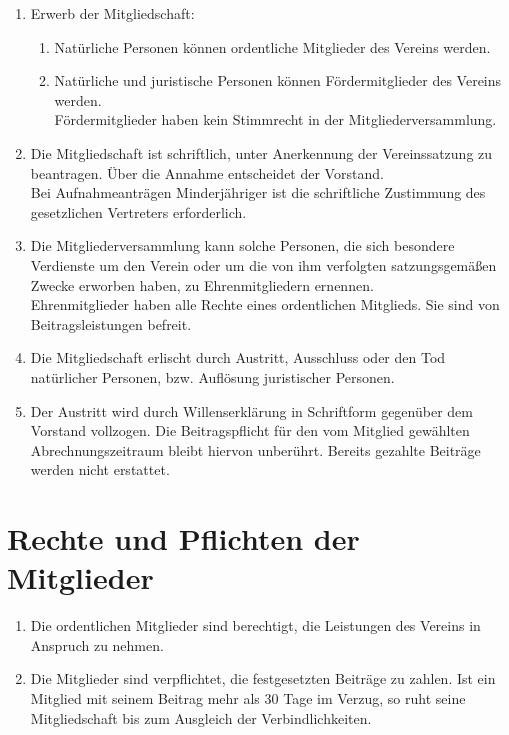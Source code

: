 \documentclass[10pt,a4paper]{scrartcl}
\begin{document}
\begin{enumerate}[label=(\arabic*)]
\item
  Erwerb der Mitgliedschaft:
  \begin{enumerate}[label=(\alph*)]
  \item
    Natürliche Personen können ordentliche Mitglieder des Vereins werden.
  \item
    Natürliche und juristische Personen können Fördermitglieder des Vereins werden.\\
    Fördermitglieder haben kein Stimmrecht in der Mitgliederversammlung.
  \end{enumerate}
\item
  Die Mitgliedschaft ist schriftlich, unter Anerkennung der Vereinssatzung zu beantragen.
  Über die Annahme entscheidet der Vorstand.\\
  Bei Aufnahmeanträgen Minderjähriger ist die schriftliche Zustimmung des gesetzlichen
  Vertreters erforderlich.
\item
  Die Mitgliederversammlung kann solche Personen, die sich besondere Verdienste um
  den Verein oder um die von ihm verfolgten satzungsgemäßen Zwecke erworben
  haben, zu Ehrenmitgliedern ernennen.\\
  Ehrenmitglieder haben alle Rechte eines ordentlichen Mitglieds.
  Sie sind von Beitragsleistungen befreit.
\item
  Die Mitgliedschaft erlischt durch Austritt, Ausschluss oder den Tod natürlicher
  Personen, bzw. Auflösung juristischer Personen.
\item
  Der Austritt wird durch Willenserklärung in Schriftform gegenüber dem Vorstand
  vollzogen. Die Beitragspflicht für den vom Mitglied gewählten Abrechnungszeitraum
  bleibt hiervon unberührt. Bereits gezahlte Beiträge werden nicht erstattet.
\end{enumerate}


\section{Rechte und Pflichten der Mitglieder}

\begin{enumerate}[label=(\arabic*)]
\item
  Die ordentlichen Mitglieder sind berechtigt, die Leistungen des Vereins
  in Anspruch zu nehmen.
\item
  Die Mitglieder sind verpflichtet, die festgesetzten Beiträge zu zahlen.
  Ist ein Mitglied mit seinem Beitrag mehr als 30 Tage im Verzug, so ruht seine
  Mitgliedschaft bis zum Ausgleich der Verbindlichkeiten.
\end{enumerate}
\end{document}
